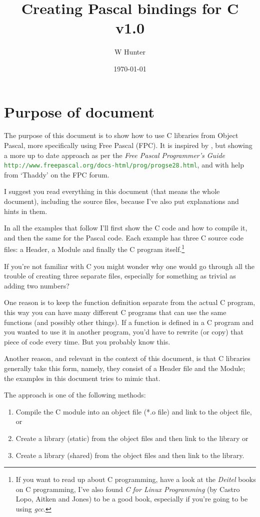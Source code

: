 \documentclass[10pt,a4paper]{article}
\title{Creating Pascal bindings for C\\
\vspace{0.5em}
\normalsize v1.0}
\author{W Hunter}
\date{\mydate\today}
\newcommand{\mytext}[1]{\textcolor{ForestGreen}{\texttt{#1}}}
\begin{document}
\maketitle
\tableofcontents
\clearpage

\section{Purpose of document}
The purpose of this document is to show how to use C libraries from Object
Pascal, more specifically using Free Pascal (FPC). It is inspired by
\cite{cinfree}, but showing a more up to date approach as per
the \textit{Free Pascal Programmer's Guide}
\mytext{http://www.freepascal.org/docs-html/prog/progse28.html},
and with help from `Thaddy' on the FPC forum.

I suggest you read everything in this document (that means the whole
document), including the source files,
because I've also put explanations and hints in them.

In all the examples that follow I'll first show the C code and how to compile it,
and then the same for the Pascal code. Each example has three C source code files: a Header, 
a Module and finally the C program itself.\footnote{If you
want to read up about C programming, have a look at the \textit{Deitel} books on C 
programming, I've also found \textit{C for Linux Programming} (by Castro Lopo, Aitken and 
Jones) to be a good book, especially if you're
going to be using \textit{gcc}.}

If you're not familiar with C you might wonder why one would go through all the
trouble of creating three separate files, especially for something as trivial
as adding two numbers?

One reason is to keep the function definition separate from the actual C program, this way 
you can have many different C programs that can use the same functions (and possibly other 
things). If a function is defined in a C program and you wanted to use it in another 
program, you'd have to rewrite (or copy) that piece of code every time. But you probably 
know this.

Another reason, and relevant in the context of this document, is that C libraries generally 
take this form, namely, they consist of a Header file
and the Module; the examples in this document tries to mimic that.

The approach is one of the following methods:
\begin{enumerate}
\item Compile the C module into an object file (*.o file) and link to the object file, or
\item Create a library (static) from the object files and then link
to the library or
\item Create a library (shared) from the object files and then link
to the library.
\end{enumerate}
\end{document}

